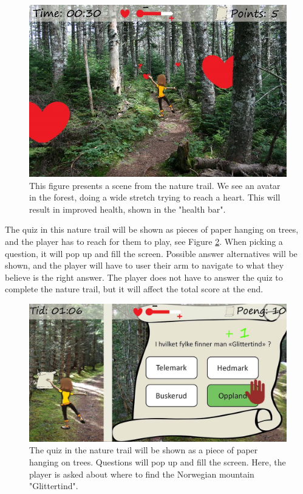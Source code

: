 \begin{figure} [H]
\centering
\includegraphics[scale=0.45]{game1engelsk.jpg}
\caption[Nature trail - stretching]{This figure presents a scene from the nature trail. We see an avatar in the forest, doing a wide stretch trying to reach a heart. This will result in improved health, shown in the "health bar".}
\label{fig:hearts}
\end{figure}

The quiz in this nature trail will be shown as pieces of paper hanging on trees, and the player has to reach for them to play, see Figure \ref{fig:quiz}. When picking a question, it will pop up and fill the screen. Possible answer alternatives will be shown, and the player will have to user their arm to navigate to what they believe is the right answer. The player does not have to answer the quiz to complete the nature trail, but it will affect the total score at the end. 

\begin{figure} [H]
\centering
\includegraphics[scale=0.5]{quiz.jpg}
\caption[Nature trail - quiz]{The quiz in the nature trail will be shown as a piece of paper hanging on trees. Questions will pop up and fill the screen. Here, the player is asked about where to find the Norwegian mountain "Glittertind".}
\label{fig:quiz}
\end{figure} 

